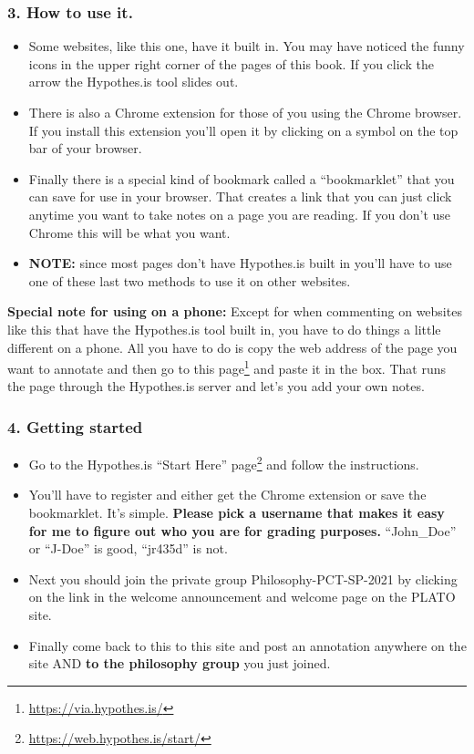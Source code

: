\documentclass[
  12pt, openany]{book}
\makeatletter
\renewcommand{\href}[2]{#2\footnote{\url{#1}}}
\newenvironment{kframe}{%
\medskip{}
\setlength{\fboxsep}{.8em}
 \def\at@end@of@kframe{}%
 \ifinner\ifhmode%
  \def\at@end@of@kframe{\end{minipage}}%
  \begin{minipage}{\columnwidth}%
 \fi\fi%
 \def\FrameCommand##1{\hskip\@totalleftmargin \hskip-\fboxsep
 \colorbox{shadecolor}{##1}\hskip-\fboxsep
     \hskip-\linewidth \hskip-\@totalleftmargin \hskip\columnwidth}%
 \MakeFramed {\advance\hsize-\width
   \@totalleftmargin\z@ \linewidth\hsize
   \@setminipage}}%
 {\par\unskip\endMakeFramed%
 \at@end@of@kframe}
\newenvironment{rmdblock}[1]
  {
  \begin{itemize}
  \renewcommand{\labelitemi}{
    \raisebox{-.7\height}[0pt][0pt]{
      {\setkeys{Gin}{width=3em,keepaspectratio}\texttt{[image: img/\#1]}}
    }
  }
  \setlength{\fboxsep}{1em}
  \begin{kframe}
  \item
  }
  {
  \end{kframe}
  \end{itemize}
  }
\newenvironment{note}
  {\begin{rmdblock}{note}}
  {\end{rmdblock}}
\makeatother
\begin{document}
\hypertarget{how-to-use-it.}{%
\subsubsection*{3. How to use it.}\label{how-to-use-it.}}


\begin{itemize}
\item
  Some websites, like this one, have it built in. You may have noticed the funny icons in the upper right corner of the pages of this book. If you click the arrow the Hypothes.is tool slides out.
\item
  There is also a Chrome extension for those of you using the Chrome browser. If you install this extension you'll open it by clicking on a symbol on the top bar of your browser.
\item
  Finally there is a special kind of bookmark called a ``bookmarklet'' that you can save for use in your browser. That creates a link that you can just click anytime you want to take notes on a page you are reading. If you don't use Chrome this will be what you want.
\item
  \textbf{NOTE:} since most pages don't have Hypothes.is built in you'll have to use one of these last two methods to use it on other websites.
\end{itemize}

\begin{note}

\textbf{Special note for using on a phone:} Except for when commenting on websites like this that have the Hypothes.is tool built in, you have to do things a little different on a phone. All you have to do is copy the web address of the page you want to annotate and then \href{https://via.hypothes.is/}{go to this page} and paste it in the box. That runs the page through the Hypothes.is server and let's you add your own notes.

\end{note}

\hypertarget{getting-started}{%
\subsubsection*{4. Getting started}\label{getting-started}}


\begin{itemize}
\item
  Go to the Hypothes.is \href{https://web.hypothes.is/start/}{``Start Here'' page} and follow the instructions.
\item
  You'll have to register and either get the Chrome extension or save the bookmarklet. It's simple. \textbf{Please pick a username that makes it easy for me to figure out who you are for grading purposes.} ``John\_Doe'' or ``J-Doe'' is good, ``jr435d'' is not.
\item
  Next you should join the private group Philosophy-PCT-SP-2021 by clicking on the link in the welcome announcement and welcome page on the PLATO site.
\item
  Finally come back to this to this site and post an annotation anywhere on the site AND \textbf{to the philosophy group} you just joined.
\end{itemize}
\end{document}
